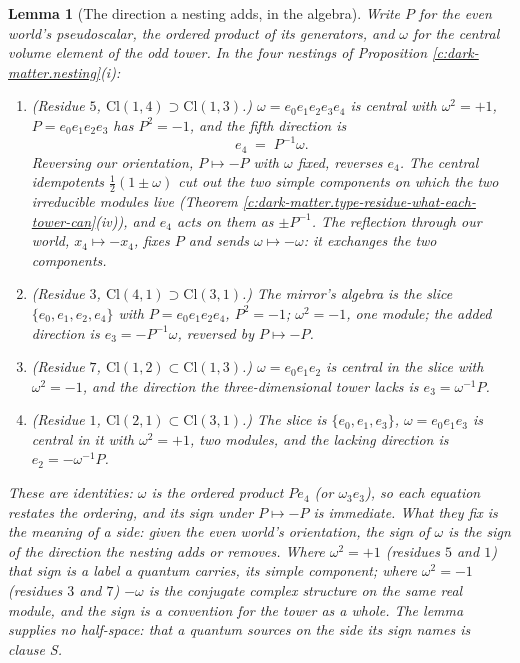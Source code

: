 \documentclass[11pt]{article}
\newtheorem{lemma}[theorem]{Lemma}
\theoremstyle{definition}
\theoremstyle{plain}
\newcommand{\changedmark}[2]{\marginpar{\raggedright\scriptsize\color{#1}#2}}
\providecommand{\Cl}{}\renewcommand{\Cl}{\mathrm{Cl}}
\begin{document}
\begin{lemma}[The direction a nesting adds, in the algebra]\label{c:dark-matter.direction-nesting-adds-algebra}
\changedmark{gray}{reworded}
Write $P$ for the even world's pseudoscalar, the ordered product of its generators, and $\omega$ for the central volume element of the odd tower. In the four nestings of Proposition \ref{c:dark-matter.nesting}(i):
\begin{enumerate}
\item[(i)] (Residue $5$, $\Cl(1,4) \supset \Cl(1,3)$.) $\omega = e_{0}e_{1}e_{2}e_{3}e_{4}$ is central with $\omega^{2} = +1$, $P = e_{0}e_{1}e_{2}e_{3}$ has $P^{2} = -1$, and the fifth direction is
\[
e_{4} \;=\; P^{-1}\omega .
\]
Reversing our orientation, $P \mapsto -P$ with $\omega$ fixed, reverses $e_{4}$. The central idempotents $\tfrac{1}{2}(1 \pm \omega)$ cut out the two simple components on which the two irreducible modules live (Theorem \ref{c:dark-matter.type-residue-what-each-tower-can}(iv)), and $e_{4}$ acts on them as $\pm P^{-1}$. The reflection through our world, $x_{4} \mapsto -x_{4}$, fixes $P$ and sends $\omega \mapsto -\omega$: it exchanges the two components.
\item[(ii)] (Residue $3$, $\Cl(4,1) \supset \Cl(3,1)$.) The mirror's algebra is the slice $\{e_{0}, e_{1}, e_{2}, e_{4}\}$ with $P = e_{0}e_{1}e_{2}e_{4}$, $P^{2} = -1$; $\omega^{2} = -1$, one module; the added direction is $e_{3} = -P^{-1}\omega$, reversed by $P \mapsto -P$.
\item[(iii)] (Residue $7$, $\Cl(1,2) \subset \Cl(1,3)$.) $\omega = e_{0}e_{1}e_{2}$ is central in the slice with $\omega^{2} = -1$, and the direction the three-dimensional tower lacks is $e_{3} = \omega^{-1}P$.
\item[(iv)] (Residue $1$, $\Cl(2,1) \subset \Cl(3,1)$.) The slice is $\{e_{0}, e_{1}, e_{3}\}$, $\omega = e_{0}e_{1}e_{3}$ is central in it with $\omega^{2} = +1$, two modules, and the lacking direction is $e_{2} = -\omega^{-1}P$.
\end{enumerate}
These are identities: $\omega$ is the ordered product $P e_{4}$ (or $\omega_{3}e_{3}$), so each equation restates the ordering, and its sign under $P \mapsto -P$ is immediate. What they fix is the meaning of a side: given the even world's orientation, the sign of $\omega$ is the sign of the direction the nesting adds or removes. Where $\omega^{2} = +1$ (residues $5$ and $1$) that sign is a label a quantum carries, its simple component; where $\omega^{2} = -1$ (residues $3$ and $7$) $-\omega$ is the conjugate complex structure on the same real module, and the sign is a convention for the tower as a whole. The lemma supplies no half-space: that a quantum sources on the side its sign names is clause S.
\end{lemma}
\end{document}
